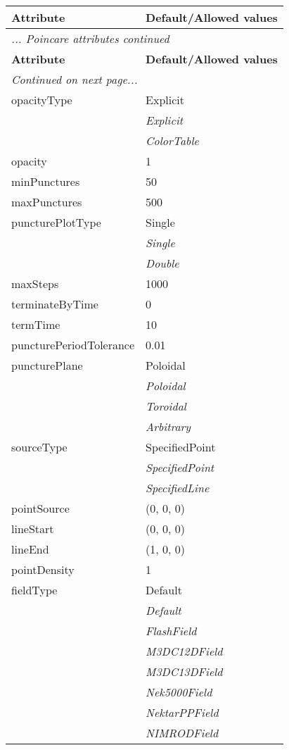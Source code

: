 \documentclass[10pt,a4paper]{report}
\begin{document}
\begin{longtable}{ll}
{\bf Attribute} & {\bf Default/Allowed values} \\
\hline \hline
\endfirsthead
\multicolumn{2}{l}{{\it ... Poincare attributes continued}} \\
{\bf Attribute} & {\bf Default/Allowed values} \\
\hline \hline
\endhead
\hline
\multicolumn{2}{l}{{\it Continued on next page...}} \\
\endfoot
\hline
\endlastfoot

opacityType  &  Explicit   \\
 & {\it  Explicit} \\
 & {\it  ColorTable} \\
opacity  &  1 \\
minPunctures  &  50 \\
maxPunctures  &  500 \\
puncturePlotType  &  Single   \\
 & {\it  Single} \\
 & {\it  Double} \\
maxSteps  &  1000 \\
terminateByTime  &  0 \\
termTime  &  10 \\
puncturePeriodTolerance  &  0.01 \\
puncturePlane  &  Poloidal   \\
 & {\it  Poloidal} \\
 & {\it  Toroidal} \\
 & {\it  Arbitrary} \\
sourceType  &  SpecifiedPoint   \\
 & {\it  SpecifiedPoint} \\
 & {\it  SpecifiedLine} \\
pointSource  &  (0, 0, 0) \\
lineStart  &  (0, 0, 0) \\
lineEnd  &  (1, 0, 0) \\
pointDensity  &  1 \\
fieldType  &  Default   \\
 & {\it  Default} \\
 & {\it  FlashField} \\
 & {\it  M3DC12DField} \\
 & {\it  M3DC13DField} \\
 & {\it  Nek5000Field} \\
 & {\it  NektarPPField} \\
 & {\it  NIMRODField} \\

\end{longtable}
\end{document}

